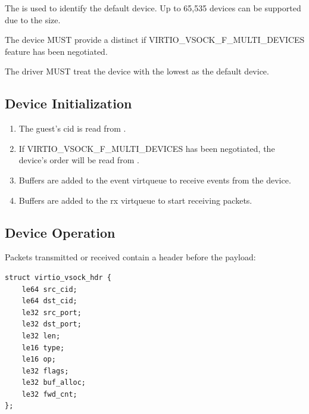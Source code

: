 The  is used to identify the default device. Up to
65,535 devices can be supported due to the size.


The device MUST provide a distinct  if
VIRTIO_VSOCK_F_MULTI_DEVICES feature has been negotiated.


The driver MUST treat the device with the lowest  as
the default device.

\subsection{Device Initialization}\label{sec:Device Types / Socket Device / Device Initialization}

\begin{enumerate}
\item The guest's cid is read from .

\item If VIRTIO_VSOCK_F_MULTI_DEVICES has been negotiated, the device's
order will be read from .

\item Buffers are added to the event virtqueue to receive events from the device.

\item Buffers are added to the rx virtqueue to start receiving packets.
\end{enumerate}

\subsection{Device Operation}\label{sec:Device Types / Socket Device / Device Operation}

Packets transmitted or received contain a header before the payload:

\begin{lstlisting}
struct virtio_vsock_hdr {
	le64 src_cid;
	le64 dst_cid;
	le32 src_port;
	le32 dst_port;
	le32 len;
	le16 type;
	le16 op;
	le32 flags;
	le32 buf_alloc;
	le32 fwd_cnt;
};
\end{lstlisting}

